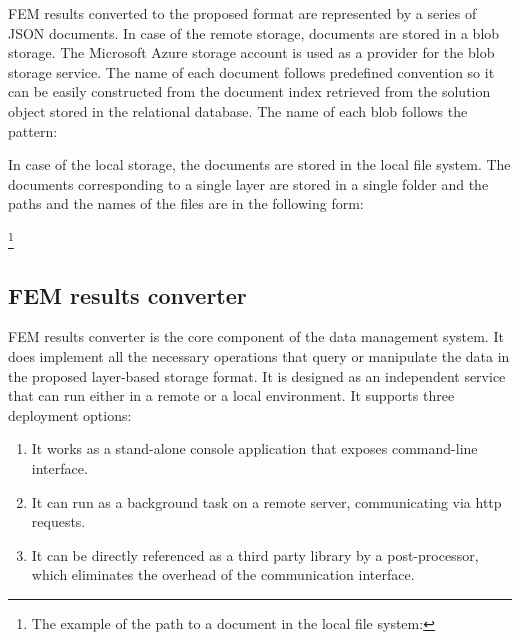 FEM results converted to the proposed format are represented by a series of JSON documents. In case of the remote storage, documents are stored in a blob storage. The Microsoft Azure storage account is used as a provider for the blob storage service. The name of each document follows predefined convention so it can be easily constructed from the document index retrieved from the solution object stored in the relational database. The name of each blob follows the pattern:


\noindent
In case of the local storage, the documents are stored in the local file system. The documents corresponding to a single layer are stored in a single folder and the paths and the names of the files are in the following form:

\footnote{The example of the path to a document in the local file system:\par {}}

\subsection*{FEM results converter}

FEM results converter is the core component of the data management system. It does implement all the necessary operations that query or manipulate the data in the proposed layer-based storage format. It is designed as an independent service that can run either in a remote or a local environment. It supports three deployment options:

\begin{enumerate}
    \item It works as a stand-alone console application that exposes command-line interface.
    \item It can run as a background task on a remote server, communicating via http requests.
    \item It can be directly referenced as a third party library by a post-processor, which eliminates the overhead of the communication interface.
\end{enumerate}


